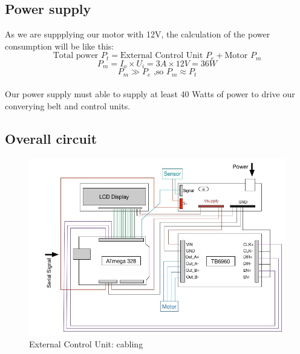 \documentclass[11pt,a4paper]{article}
\begin{document}
\subsection{Power supply}

As we are suppplying our motor with 12V, the calculation of the power consumption will be like this:\\

\begin{equation}
   \text{Total power }P_t  = \text{External Control Unit } P_e + \text{Motor }P_m
\end{equation}
\begin{equation}
   P_m = I_o \times U_i = 3A \times 12V = 36 W 
\end{equation}
\begin{equation}
   P_m \gg P_e \text{ ,so }  P_m \approx P_t
\end{equation}
\\

Our power supply must able to supply at least 40 Watts of power to drive our converying belt and control units.

\newpage
\subsection{Overall circuit}

\begin{figure}[h!]
	\centering
	\includegraphics[scale=0.8,angle=90]{img/ECU.jpg}
	\caption{External Control Unit: cabling}
	\label{fig:External Control Unit: cabling}
\end{figure}

\newpage
\end{document}
